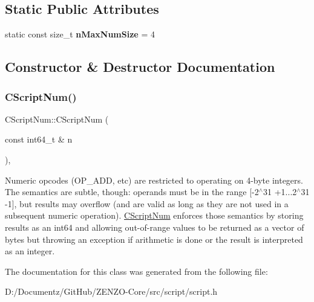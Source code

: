 \subsection*{Static Public Attributes}
\begin{DoxyCompactItemize}
\item 
\mbox{\label{class_c_script_num_a50a64fe3041a47f7d87d64d4533b5431}} 
static const size\+\_\+t {\bfseries n\+Max\+Num\+Size} = 4
\end{DoxyCompactItemize}


\subsection{Constructor \& Destructor Documentation}
\mbox{\label{class_c_script_num_abd546b6e7786ba70aeeb81e218d055bc}} 
\subsubsection{\texorpdfstring{CScriptNum()}{CScriptNum()}}
{\footnotesize\ttfamily C\+Script\+Num\+::\+C\+Script\+Num (\begin{DoxyParamCaption}\item[{const int64\+\_\+t \&}]{n }\end{DoxyParamCaption})\hspace{0.3cm}{\ttfamily [inline]}, {\ttfamily [explicit]}}

Numeric opcodes (O\+P\+\_\+A\+DD, etc) are restricted to operating on 4-\/byte integers. The semantics are subtle, though\+: operands must be in the range \mbox{[}-\/2$^\wedge$31 +1...2$^\wedge$31 -\/1\mbox{]}, but results may overflow (and are valid as long as they are not used in a subsequent numeric operation). \mbox{\hyperlink{class_c_script_num}{C\+Script\+Num}} enforces those semantics by storing results as an int64 and allowing out-\/of-\/range values to be returned as a vector of bytes but throwing an exception if arithmetic is done or the result is interpreted as an integer. 

The documentation for this class was generated from the following file\+:\begin{DoxyCompactItemize}
\item 
D\+:/\+Documentz/\+Git\+Hub/\+Z\+E\+N\+Z\+O-\/\+Core/src/script/script.\+h\end{DoxyCompactItemize}
